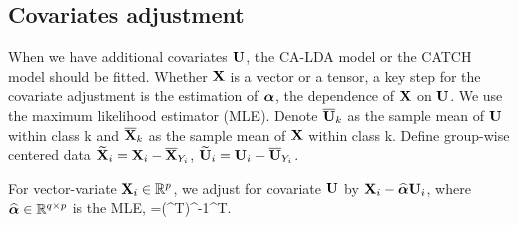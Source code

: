 %  
%  



\subsection{Covariates adjustment}\label{sec:covlam}

When we have additional covariates $\mathbf{U}$, the CA-LDA model or the CATCH model should be fitted. Whether $\mathbf{X}$ is a vector or a tensor, a key step for the covariate adjustment is the estimation of $\boldsymbol{\alpha}$, the dependence of $\mathbf{X}$ on $\mathbf{U}$. We use the maximum likelihood estimator (MLE). Denote $\overline{\mathbf{U}}_k$ as the sample mean of $\mathbf{U}$ within class k and $\overline{\mathbf{X}}_k$ as the sample mean of $\mathbf{X}$ within class k. Define group-wise centered data $\widetilde{\mathbf{X}}_i=\mathbf{X}_i-\overline{\mathbf{X}}_{Y_i}$, $\widetilde{\mathbf{U}}_i=\mathbf{U}_i-\overline{\mathbf{U}}_{Y_i}$. 


For vector-variate $\mathbf{X}_i\in\mathbb{R}^p$, we adjust for covariate $\mathbf{U}$ by $\mathbf{X}_i-\widehat{\boldsymbol{\alpha}}\mathbf{U}_i$, where $\widehat{\boldsymbol{\alpha}}\in\mathbb{R}^{q\times p}$ is the MLE,
\beq
\hatbolalpha=(\widetilde{\mbU}^T\widetilde{\mbU})^{-1}\widetilde{\mbU}^T\widetilde{\mbX}.
\eeq   


